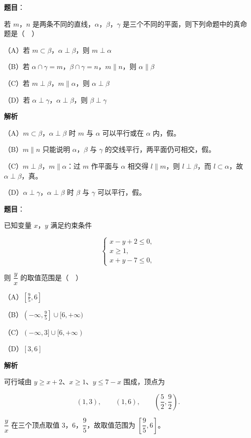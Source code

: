 \begin{answer}

\textbf{题目}：

若 $m$，$n$ 是两条不同的直线，$\alpha$，$\beta$，$\gamma$ 是三个不同的平面，则下列命题中的真命题是（　）

（A）若 $m\subset\beta$，$\alpha\perp\beta$，则 $m\perp\alpha$

（B）若 $\alpha\cap\gamma=m$，$\beta\cap\gamma=n$，$m\parallel n$，则 $\alpha\parallel\beta$

（C）若 $m\perp\beta$，$m\parallel\alpha$，则 $\alpha\perp\beta$

（D）若 $\alpha\perp\gamma$，$\alpha\perp\beta$，则 $\beta\perp\gamma$

\textbf{解析}

（A）$m\subset\beta$，$\alpha\perp\beta$ 时 $m$ 与 $\alpha$ 可以平行或在 $\alpha$ 内，假。

（B）$m\parallel n$ 只能说明 $\alpha$，$\beta$ 与 $\gamma$ 的交线平行，两平面仍可相交，假。

（C）$m\perp\beta$，$m\parallel\alpha$：过 $m$ 作平面与 $\alpha$ 相交得 $l\parallel m$，则 $l\perp\beta$，而 $l\subset\alpha$，故 $\alpha\perp\beta$，真。

（D）$\alpha\perp\gamma$，$\alpha\perp\beta$ 时 $\beta$ 与 $\gamma$ 可以平行，假。


\end{answer}
\begin{answer}

\textbf{题目}：

已知变量 $x$，$y$ 满足约束条件

\nopagebreak[4]
\[\begin{cases}x-y+2\leqslant0,\\ x\geqslant1,\\ x+y-7\leqslant0,\end{cases}\]

则 $\dfrac yx$ 的取值范围是（　）

（A）$\left[\frac95,6\right]$

（B）$\left(-\infty,\frac95\right]\cup[6,+\infty)$

（C）$(-\infty,3]\cup[6,+\infty)$

（D）$[3,6]$

\textbf{解析}

可行域由 $y\geqslant x+2$、$x\geqslant1$、$y\leqslant7-x$ 围成，顶点为

\nopagebreak[4]
\[(1,3),\qquad (1,6),\qquad \left(\frac52,\frac92\right).\]

$\dfrac yx$ 在三个顶点取值 $3$，$6$，$\dfrac95$，故取值范围为 $\left[\dfrac95,6\right]$。


\end{answer}
